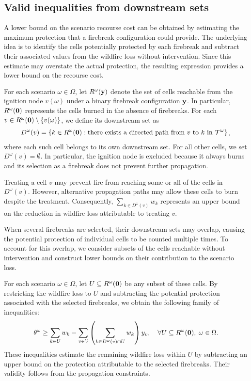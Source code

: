 \documentclass{itor}
\begin{document}
\subsection{Valid inequalities from downstream sets}
\label{subsec:coverage_inequalities}

A lower bound on the scenario recourse cost can be obtained by estimating the maximum protection that a firebreak configuration could provide. The underlying idea is to identify the cells potentially protected by each firebreak and subtract their associated values from the wildfire loss without intervention. Since this estimate may overstate the actual protection, the resulting expression provides a lower bound on the recourse cost.

For each scenario $\omega \in \Omega$, let $R^\omega(\vb{y})$ denote the set of cells reachable from the ignition node $v(\omega)$ under a binary firebreak configuration $\vb{y}$. In particular, $R^\omega(\vb{0})$ represents the cells burned in the absence of firebreaks. For each $v \in R^\omega(\vb{0}) \setminus \{v(\omega)\}$, we define its downstream set as
\begin{equation}
\label{eq:downstream_set}
D^\omega(v) =
\left\{
k \in R^\omega(\vb{0}) :
\text{there exists a directed path from } v
\text{ to } k \text{ in } \mathcal{T}^\omega
\right\},
\end{equation}
where each such cell belongs to its own downstream set. For all other cells, we set $D^\omega(v)=\emptyset$. In particular, the ignition node is excluded because it always burns and its selection as a firebreak does not prevent further propagation.

Treating a cell $v$ may prevent fire from reaching some or all of the cells in $D^\omega(v)$. However, alternative propagation paths may allow these cells to burn despite the treatment. Consequently, $\sum_{k \in D^\omega(v)} w_k$ represents an upper bound on the reduction in wildfire loss attributable to treating $v$.

When several firebreaks are selected, their downstream sets may overlap, causing the potential protection of individual cells to be counted multiple times. To account for this overlap, we consider subsets of the cells reachable without intervention and construct lower bounds on their contribution to the scenario loss.

For each scenario $\omega \in \Omega$, let $U \subseteq R^\omega(\vb{0})$ be any subset of these cells. By restricting the wildfire loss to $U$ and subtracting the potential protection associated with the selected firebreaks, we obtain the following family of inequalities:
\begin{equation}
\label{eq:coverage_projected}
\theta^\omega \geq
\sum_{k \in U} w_k
-
\sum_{v \in \mathcal{V}}
\left(
\sum_{k \in D^\omega(v) \cap U} w_k
\right)y_v,
\quad
\forall U \subseteq R^\omega(\vb{0}),\;
\omega \in \Omega.
\end{equation}
These inequalities estimate the remaining wildfire loss within $U$ by subtracting an upper bound on the protection attributable to the selected firebreaks. Their validity follows from the propagation constraints.
\end{document}
